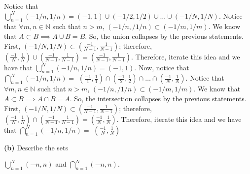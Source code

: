 \documentclass[12pt]{article}
\newcommand{\N}{\mathbb{N}}
\begin{document}
\begin{solution}
\newline Notice that $\displaystyle\bigcup_{n=1}^N(-1/n,1/n)=(-1,1)\cup (-1/2,1/2)\cup \dots \cup (-1/N,1/N)$.\newline
Notice that $\forall m,n\in \N$ such that $n>m$, $(-1/n,/1/n)\subset(-1/m,1/m)$.\newline
We know that $A\subset B\implies A\cup B = B$.\newline
So, the union collapses by the previous statements.\newline
First, $(-1/N,1/N)\subset (\frac{-1}{N-1},\frac{1}{N-1})$; therefore, $(\frac{-1}{N},\frac{1}{N})\cup(\frac{-1}{N-1},\frac{1}{N-1})=(\frac{-1}{N-1},\frac{1}{N-1})$.\newline
Therefore, iterate this idea and we have that $\displaystyle\bigcup_{n=1}^N(-1/n,1/n)=(-1,1)$.
\newline\newline\newline
Now, notice that $\displaystyle\bigcap_{n=1}^N(-1/n,1/n) = $
$(\frac{-1}{1},\frac{1}{1})\cap(\frac{-1}{2},\frac{1}{2})\cap\dots\cap(\frac{-1}{N},\frac{1}{N})$.\newline
Notice that $\forall m,n\in \N$ such that $n>m$, $(-1/n,/1/n)\subset(-1/m,1/m)$.\newline
We know that $A\subset B\implies A\cap B = A$.\newline
So, the intersection collapses by the previous statements.\newline
First, $(-1/N,1/N)\subset (\frac{-1}{N-1},\frac{1}{N-1})$; therefore, $(\frac{-1}{N},\frac{1}{N})\cap(\frac{-1}{N-1},\frac{1}{N-1})=(\frac{-1}{N},\frac{1}{N})$.\newline
Therefore, iterate this idea and we have that $\displaystyle\bigcap_{n=1}^N(-1/n,1/n) = $
$(\frac{-1}{N},\frac{1}{N})$
\end{solution}
\newpage
\begin{subproblem}\textbf{(b)}
Describe the sets\newline
\begin{center}
$\displaystyle\bigcup_{n=1}^N(-n,n)$ and $\displaystyle\bigcap_{n=1}^N(-n,n)$.
\end{center}
\end{subproblem}
\end{document}
